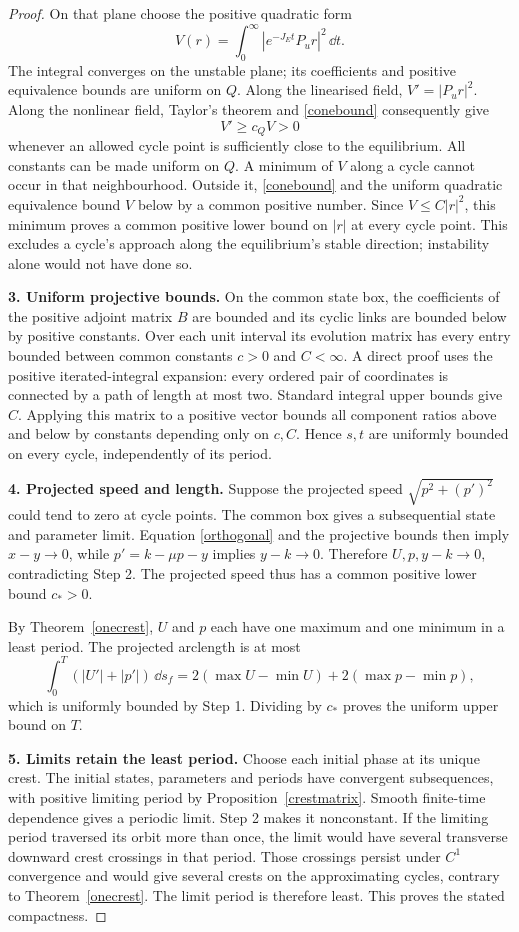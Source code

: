 \documentclass[11pt,a4paper]{article}
\theoremstyle{remark}\newtheorem{remark}[theorem]{Remark}
\begin{document}
\begin{proof}
On that plane choose the positive quadratic form
\[
 V(r)=\int_0^\infty |e^{-J_Et}P_u r|^2\,\dd t.
\]
The integral converges on the unstable plane; its coefficients and positive equivalence bounds are uniform on $Q$. Along the linearised field, $V'=|P_ur|^2$. Along the nonlinear field, Taylor's theorem and \eqref{conebound} consequently give
\[
 V'\ge c_Q V>0
\]
whenever an allowed cycle point is sufficiently close to the equilibrium. All constants can be made uniform on $Q$. A minimum of $V$ along a cycle cannot occur in that neighbourhood. Outside it, \eqref{conebound} and the uniform quadratic equivalence bound $V$ below by a common positive number. Since $V\le C|r|^2$, this minimum proves a common positive lower bound on $|r|$ at every cycle point. This excludes a cycle's approach along the equilibrium's stable direction; instability alone would not have done so.

\textbf{3. Uniform projective bounds.} On the common state box, the coefficients of the positive adjoint matrix $B$ are bounded and its cyclic links are bounded below by positive constants. Over each unit interval its evolution matrix has every entry bounded between common constants $c>0$ and $C<\infty$. A direct proof uses the positive iterated-integral expansion: every ordered pair of coordinates is connected by a path of length at most two. Standard integral upper bounds give $C$. Applying this matrix to a positive vector bounds all component ratios above and below by constants depending only on $c,C$. Hence $s,t$ are uniformly bounded on every cycle, independently of its period.

\textbf{4. Projected speed and length.} Suppose the projected speed $\sqrt{p^2+(p')^2}$ could tend to zero at cycle points. The common box gives a subsequential state and parameter limit. Equation \eqref{orthogonal} and the projective bounds then imply $x-y\to0$, while $p'=k-\mu p-y$ implies $y-k\to0$. Therefore $U,p,y-k\to0$, contradicting Step 2. The projected speed thus has a common positive lower bound $c_*>0$.

By Theorem~\ref{onecrest}, $U$ and $p$ each have one maximum and one minimum in a least period. The projected arclength is at most
\[
 \int_0^T(|U'|+|p'|)\,\dd s_f
 =2(\max U-\min U)+2(\max p-\min p),
\]
which is uniformly bounded by Step 1. Dividing by $c_*$ proves the uniform upper bound on $T$.

\textbf{5. Limits retain the least period.} Choose each initial phase at its unique crest. The initial states, parameters and periods have convergent subsequences, with positive limiting period by Proposition~\ref{crestmatrix}. Smooth finite-time dependence gives a periodic limit. Step 2 makes it nonconstant. If the limiting period traversed its orbit more than once, the limit would have several transverse downward crest crossings in that period. Those crossings persist under $C^1$ convergence and would give several crests on the approximating cycles, contrary to Theorem~\ref{onecrest}. The limit period is therefore least. This proves the stated compactness.
\end{proof}
\end{document}
